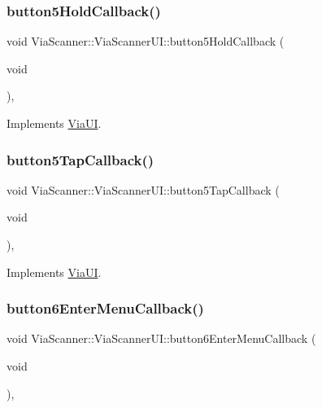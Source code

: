 \subsubsection{\texorpdfstring{button5\+Hold\+Callback()}{button5HoldCallback()}}
{\footnotesize\ttfamily void Via\+Scanner\+::\+Via\+Scanner\+U\+I\+::button5\+Hold\+Callback (\begin{DoxyParamCaption}\item[{void}]{ }\end{DoxyParamCaption})\hspace{0.3cm}{\ttfamily [override]}, {\ttfamily [virtual]}}



Implements \mbox{\hyperlink{class_via_u_i_aee783713c816e3807514ee9b06b571b0}{Via\+UI}}.

\mbox{\label{class_via_scanner_1_1_via_scanner_u_i_a10bef1a488e628c198e07bc56690199c}} 
\subsubsection{\texorpdfstring{button5\+Tap\+Callback()}{button5TapCallback()}}
{\footnotesize\ttfamily void Via\+Scanner\+::\+Via\+Scanner\+U\+I\+::button5\+Tap\+Callback (\begin{DoxyParamCaption}\item[{void}]{ }\end{DoxyParamCaption})\hspace{0.3cm}{\ttfamily [override]}, {\ttfamily [virtual]}}



Implements \mbox{\hyperlink{class_via_u_i_a5066c22385f31c24ec939d680a66a628}{Via\+UI}}.

\mbox{\label{class_via_scanner_1_1_via_scanner_u_i_a94de9ec6e40e16ba7dd8dc0ffb9adc14}} 
\subsubsection{\texorpdfstring{button6\+Enter\+Menu\+Callback()}{button6EnterMenuCallback()}}
{\footnotesize\ttfamily void Via\+Scanner\+::\+Via\+Scanner\+U\+I\+::button6\+Enter\+Menu\+Callback (\begin{DoxyParamCaption}\item[{void}]{ }\end{DoxyParamCaption})\hspace{0.3cm}{\ttfamily [override]}, {\ttfamily [virtual]}}



